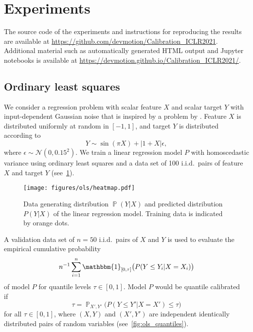 \documentclass{article}
\DeclareMathOperator{\Prob}{\mathbb{P}}
\begin{document}
\section{Experiments}
\label{app:experiments}

The source code of the experiments and instructions for reproducing the
results are available at
\url{https://github.com/devmotion/Calibration_ICLR2021}. Additional
material such as automatically generated HTML output and Jupyter
notebooks is available at
\url{https://devmotion.github.io/Calibration_ICLR2021/}.

\subsection{Ordinary least squares}\label{app:ols}

We consider a regression problem with scalar feature $X$ and scalar target $Y$ with input-dependent Gaussian noise
that is inspired by a problem by \citet{Gustafsson2019}. Feature $X$ is
distributed uniformly at random in $[-1, 1]$, and target $Y$ is distributed according to
\begin{equation*}
    Y \sim \sin(\pi X) + | 1 + X | \epsilon,
\end{equation*}
where $\epsilon \sim \mathcal{N}(0, 0.15^2)$. We train a linear regression model $P$ with
homoscedastic variance using ordinary least squares and a data set of 100 i.i.d.\
pairs of feature $X$ and target $Y$ (see~\cref{fig:ols_heatmap}).

\begin{figure}[hpt]
    \begin{center}
        \texttt{[image: figures/ols/heatmap.pdf]}
        \caption{Data generating distribution $\Prob(Y|X)$ and predicted distribution $P(Y|X)$ of the linear regression model.
        Training data is indicated by orange dots.}
        \label{fig:ols_heatmap}
    \end{center}
\end{figure}

A validation data set of $n = 50$ i.i.d.\ pairs of $X$ and $Y$ is used to
evaluate the empirical cumulative probability
\begin{equation*}
    n^{-1} \sum_{i=1}^n \mathbbm{1}_{[0,\tau]}\big(P(Y \leq Y_i | X = X_i)\big)
\end{equation*}
of model $P$ for quantile levels $\tau \in [0, 1]$. Model $P$ would be quantile
calibrated~\citep{Song2019} if
\begin{equation*}
    \tau = \Prob_{X',Y'}\big(P(Y \leq Y' | X = X') \leq \tau \big)
\end{equation*}
for all $\tau \in [0,1]$, where $(X, Y)$ and $(X', Y')$ are independent identically
distributed pairs of random variables (see~\cref{fig:ols_quantiles}).
\end{document}

